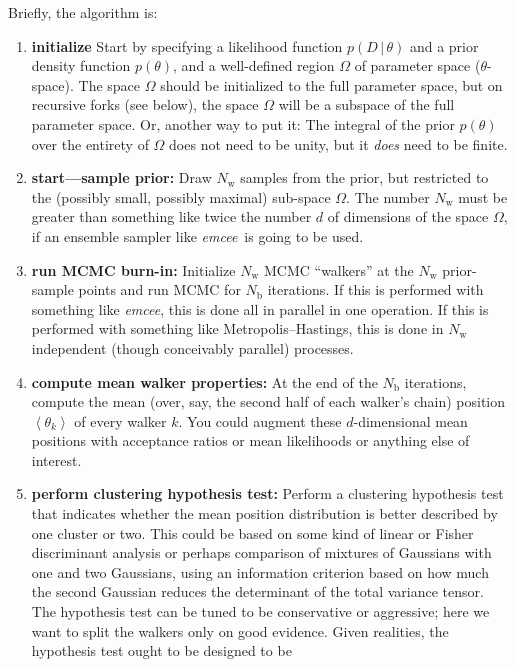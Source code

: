 \documentclass[12pt]{article}
\newcommand{\project}[1]{\textsl{#1}}
\newcommand{\emcee}{\project{emcee}}
\newcommand{\mean}[1]{\left<{#1}\right>}
\newcommand{\given}{\,|\,}
\newcommand{\data}{D}
\newcommand{\pars}{\theta}
\newcommand{\parspace}{\Omega}
\newcommand{\nwalker}{N_{\mathrm{w}}}
\newcommand{\ndim}{d}
\newcommand{\nburn}{N_{\mathrm{b}}}
\begin{document}
Briefly, the algorithm is:
\begin{enumerate}
\item \textbf{initialize} Start by specifying a likelihood function
  $p(\data\given\pars)$ and a prior density function $p(\pars)$, and a
  well-defined region $\parspace$ of parameter space ($\pars$-space).
  The space $\parspace$ should be initialized to the full parameter
  space, but on recursive forks (see below), the space $\parspace$
  will be a subspace of the full parameter space.  Or, another way to
  put it: The integral of the prior $p(\pars)$ over the entirety of
  $\parspace$ does not need to be unity, but it \emph{does} need to be
  finite.
\item \label{step:start}\textbf{start---sample prior:} Draw $\nwalker$
  samples from the prior, but restricted to the (possibly small,
  possibly maximal) sub-space $\parspace$.  The number $\nwalker$ must
  be greater than something like twice the number $\ndim$ of
  dimensions of the space $\parspace$, if an ensemble sampler like
  \emcee\ is going to be used.
\item \textbf{run MCMC burn-in:} Initialize $\nwalker$ MCMC
  ``walkers'' at the $\nwalker$ prior-sample points and run MCMC for
  $\nburn$ iterations.  If this is performed with something like
  \emcee, this is done all in parallel in one operation.  If this is
  performed with something like Metropolis--Hastings, this is done in
  $\nwalker$ independent (though conceivably parallel) processes.
\item \textbf{compute mean walker properties:} At the end of the
  $\nburn$ iterations, compute the mean (over, say, the second half of
  each walker's chain) position $\mean{\pars_k}$ of every walker $k$.
  You could augment these $\ndim$-dimensional mean positions with
  acceptance ratios or mean likelihoods or anything else of interest.
\item \label{step:test}\textbf{perform clustering hypothesis test:}
  Perform a clustering hypothesis test that indicates whether the mean
  position distribution is better described by one cluster or two.
  This could be based on some kind of linear or Fisher discriminant
  analysis or perhaps comparison of mixtures of Gaussians with one and
  two Gaussians, using an information criterion based on how much the
  second Gaussian reduces the determinant of the total variance
  tensor.  The hypothesis test can be tuned to be conservative or
  aggressive; here we want to split the walkers only on good evidence.
  Given realities, the hypothesis test ought to be designed to be

\end{enumerate}
\end{document}
